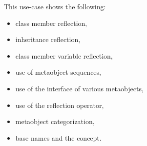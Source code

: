 This use-case shows the following:

\begin{itemize}
\item{class member reflection,}
\item{inheritance reflection,}
\item{class member variable reflection,}
\item{use of metaobject sequences,}
\item{use of the interface of various metaobjects,}
\item{use of the reflection operator,}
\item{metaobject categorization,}
\item{base names and the  concept.}
\end{itemize}

